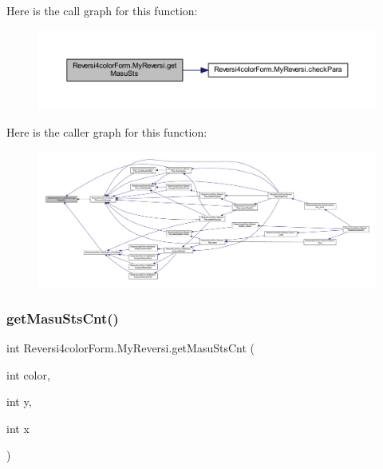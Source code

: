 Here is the call graph for this function\+:\nopagebreak
\begin{figure}[H]
\begin{center}
\leavevmode
\includegraphics[width=350pt]{class_reversi4color_form_1_1_my_reversi_adc564d9d8aa75a871d33e09373485530_cgraph}
\end{center}
\end{figure}
Here is the caller graph for this function\+:\nopagebreak
\begin{figure}[H]
\begin{center}
\leavevmode
\includegraphics[width=350pt]{class_reversi4color_form_1_1_my_reversi_adc564d9d8aa75a871d33e09373485530_icgraph}
\end{center}
\end{figure}
\mbox{\label{class_reversi4color_form_1_1_my_reversi_a5380e8f78bafedf7b0cdc86d943c8c22}} 
\subsubsection{\texorpdfstring{get\+Masu\+Sts\+Cnt()}{getMasuStsCnt()}}
{\footnotesize\ttfamily int Reversi4color\+Form.\+My\+Reversi.\+get\+Masu\+Sts\+Cnt (\begin{DoxyParamCaption}\item[{int}]{color,  }\item[{int}]{y,  }\item[{int}]{x }\end{DoxyParamCaption})}



